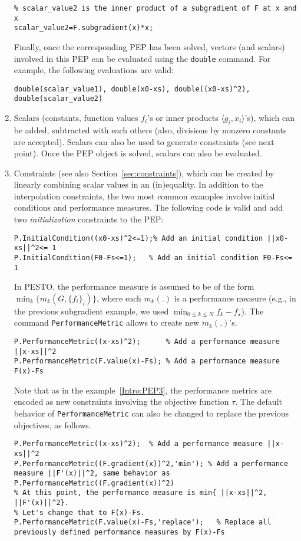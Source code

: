 \documentclass[11pt,a4paper]{article}
\newcommand{\inner}[2]{{\langle #1, #2\rangle}}
\begin{document}
\begin{enumerate}
\begin{lstlisting}
% scalar_value2 is the inner product of a subgradient of F at x and x
scalar_value2=F.subgradient(x)*x;
		\end{lstlisting}
		Finally, once the corresponding PEP has been solved, vectors (and scalars) involved in this PEP can be evaluated using the \verb?double? command. For example, the following evaluations are valid:\\[-1cm]
		\begin{lstlisting}
double(scalar_value1), double(x0-xs), double((x0-xs)^2), double(scalar_value2)
		\end{lstlisting}
		\item Scalars (constants, function values $f_i$'s or inner products $\inner{g_i}{x_i}$'s), which can be added, subtracted with each others (also, divisions by nonzero constants are accepted). Scalars can also be used to generate constraints (see next point). Once the PEP object is solved, scalars can also be evaluated.
		\item Constraints (see also Section~\ref{sec:constraints}), which can be created by linearly combining scalar values in an (in)equality. In addition to the interpolation constraints, the two most common examples involve initial conditions and performance measures. The following code is valid and add two \emph{initialization} constraints to the PEP:\\[-1cm]
		\begin{lstlisting}
P.InitialCondition((x0-xs)^2<=1);% Add an initial condition ||x0-xs||^2<= 1
P.InitialCondition(F0-Fs<=1);	% Add an initial condition F0-Fs<= 1
		\end{lstlisting}
		In PESTO, the performance measure is assumed to be of the form $\min_k \{m_k(G,\{f_i\}_i)\}$, where each $m_k(.)$ is a performance measure (e.g., in the previous subgradient example, we used $\min_{0\leq k \leq N} f_k-f_\star$). The command \verb?PerformanceMetric? allows to create new $m_k(.)$'s.\\[-1cm]
		\begin{lstlisting}
P.PerformanceMetric((x-xs)^2); 		% Add a performance measure ||x-xs||^2
P.PerformanceMetric(F.value(x)-Fs);	% Add a performance measure F(x)-Fs
		\end{lstlisting}
		Note that as in the example~\eqref{Intro:PEP3}, the performance metrics are encoded as new constraints involving the objective function $\tau$. The default behavior of \verb?PerformanceMetric? can also be changed to replace the previous objectives, as follows.
		\begin{lstlisting}
P.PerformanceMetric((x-xs)^2); 	% Add a performance measure ||x-xs||^2
P.PerformanceMetric((F.gradient(x))^2,'min'); % Add a performance measure ||F'(x)||^2, same behavior as P.PerformanceMetric((F.gradient(x))^2)
% At this point, the performance measure is min{ ||x-xs||^2, ||F'(x)||^2}.
% Let's change that to F(x)-Fs.
P.PerformanceMetric(F.value(x)-Fs,'replace');	% Replace all previously defined performance measures by F(x)-Fs
		\end{lstlisting}
	\end{enumerate}
	\newpage
\end{document}

